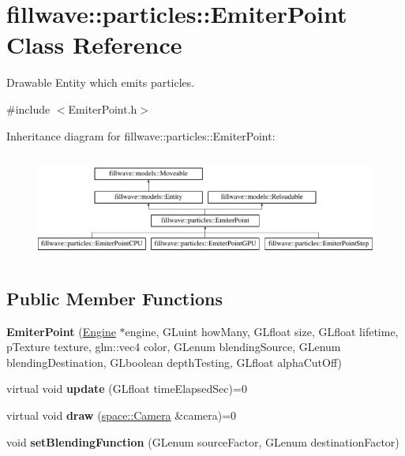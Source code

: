 \hypertarget{classfillwave_1_1particles_1_1EmiterPoint}{}\section{fillwave\+:\+:particles\+:\+:Emiter\+Point Class Reference}
\label{classfillwave_1_1particles_1_1EmiterPoint}


Drawable Entity which emits particles.  




{\ttfamily \#include $<$Emiter\+Point.\+h$>$}

Inheritance diagram for fillwave\+:\+:particles\+:\+:Emiter\+Point\+:\begin{figure}[H]
\begin{center}
\leavevmode
\includegraphics[height=3.538705cm]{classfillwave_1_1particles_1_1EmiterPoint}
\end{center}
\end{figure}
\subsection*{Public Member Functions}
\begin{DoxyCompactItemize}
\item 
\hypertarget{classfillwave_1_1particles_1_1EmiterPoint_a3245b754ca3c5b864a19b34a51054f95}{}{\bfseries Emiter\+Point} (\hyperlink{classfillwave_1_1Engine}{Engine} $\ast$engine, G\+Luint how\+Many, G\+Lfloat size, G\+Lfloat lifetime, p\+Texture texture, glm\+::vec4 color, G\+Lenum blending\+Source, G\+Lenum blending\+Destination, G\+Lboolean depth\+Testing, G\+Lfloat alpha\+Cut\+Off)\label{classfillwave_1_1particles_1_1EmiterPoint_a3245b754ca3c5b864a19b34a51054f95}

\item 
\hypertarget{classfillwave_1_1particles_1_1EmiterPoint_ade20253c3f719afd120aa99e0c74bf3c}{}virtual void {\bfseries update} (G\+Lfloat time\+Elapsed\+Sec)=0\label{classfillwave_1_1particles_1_1EmiterPoint_ade20253c3f719afd120aa99e0c74bf3c}

\item 
\hypertarget{classfillwave_1_1particles_1_1EmiterPoint_ae343ec1bb9f0c4fe4899f6750d4d3bd1}{}virtual void {\bfseries draw} (\hyperlink{classfillwave_1_1space_1_1Camera}{space\+::\+Camera} \&camera)=0\label{classfillwave_1_1particles_1_1EmiterPoint_ae343ec1bb9f0c4fe4899f6750d4d3bd1}

\item 
\hypertarget{classfillwave_1_1particles_1_1EmiterPoint_aeb90fa18eb1ace73adf28c449a769425}{}void {\bfseries set\+Blending\+Function} (G\+Lenum source\+Factor, G\+Lenum destination\+Factor)\label{classfillwave_1_1particles_1_1EmiterPoint_aeb90fa18eb1ace73adf28c449a769425}

\end{DoxyCompactItemize}
